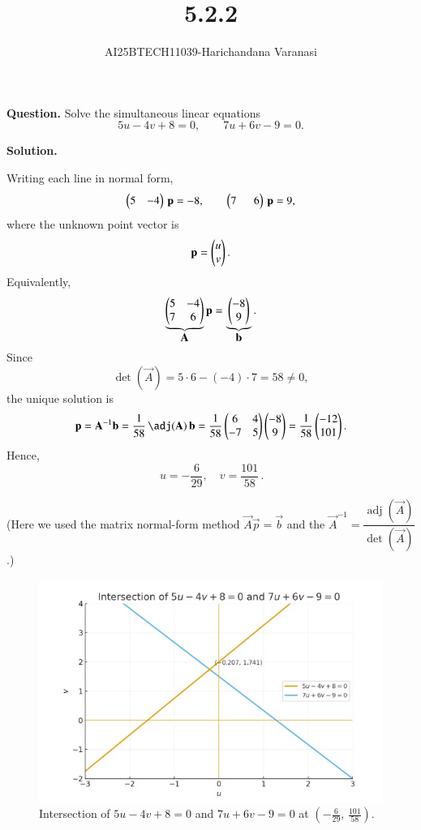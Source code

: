 \documentclass[journal]{IEEEtran}
\title{5.2.2}
\author{AI25BTECH11039-Harichandana Varanasi}
\date{}
\numberwithin{equation}{enumi}
\numberwithin{figure}{enumi}
\begin{document}
\maketitle


\noindent\textbf{Question.}\;
Solve the simultaneous linear equations
\[
5u-4v+8=0,\qquad 7u+6v-9=0 .
\]

\noindent\textbf{Solution.}
\begingroup
\setcounter{equation}{0}
\renewcommand{\theequation}{\arabic{equation}}

Writing each line in normal form,
\begin{equation}
\begin{pmatrix}5 & -4\end{pmatrix}\,\mathbf{p}=-8,\qquad
\begin{pmatrix}7 & \;\;6\end{pmatrix}\,\mathbf{p}=9,
\end{equation}
where the unknown point vector is
\begin{equation}
\mathbf{p}=\begin{pmatrix}u\\ v\end{pmatrix}.
\end{equation}
Equivalently,
\begin{equation}
\underbrace{\begin{pmatrix}5 & -4\\ 7 & 6\end{pmatrix}}_{\displaystyle \mathbf{A}}\mathbf{p}
=\underbrace{\begin{pmatrix}-8\\ 9\end{pmatrix}}_{\displaystyle \mathbf{b}} .
\end{equation}
Since
\begin{equation}
\det(\vec{A})=5\cdot6-(-4)\cdot7=58\neq 0,
\end{equation}
the unique solution is
\begin{equation}
\vec{p}=\vec{A}^{-1}\vec{b}
=\frac{1}{58}\,\adj(\vec{A})\,\vec{b}
=\frac{1}{58}\myvec{6 & 4\\ -7 & 5}\myvec{-8\\ 9}
=\frac{1}{58}\myvec{-12\\ 101}.
\end{equation}
Hence,
\begin{equation}
\boxed{\,u=-\dfrac{6}{29},\quad v=\dfrac{101}{58}\, }.
\end{equation}

{\footnotesize
(Here we used the matrix normal-form method $\vec{A}\vec{p}=\vec{b}$ and the
 $\vec{A}^{-1}=\dfrac{\operatorname{adj}(\vec{A})}{\det(\vec{A})}$.)
}

\endgroup


\clearpage                       
\begin{figure}[H]
  \centering
  \includegraphics[width=0.8\linewidth]{figs/matgeo-5.2.2.jpeg}
  \caption{Intersection of $5u-4v+8=0$ and $7u+6v-9=0$ at
           $\left(-\tfrac{6}{29},\,\tfrac{101}{58}\right)$.}
  \label{fig:5.2.2}
\end{figure}





 
\end{document}
